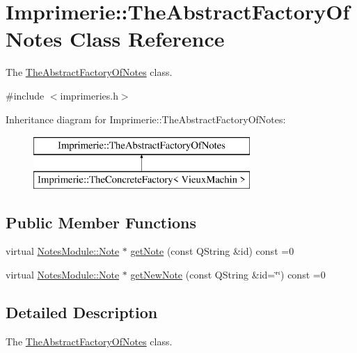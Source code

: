 \hypertarget{class_imprimerie_1_1_the_abstract_factory_of_notes}{\section{Imprimerie\-:\-:The\-Abstract\-Factory\-Of\-Notes Class Reference}
\label{class_imprimerie_1_1_the_abstract_factory_of_notes}
}


The \hyperlink{class_imprimerie_1_1_the_abstract_factory_of_notes}{The\-Abstract\-Factory\-Of\-Notes} class.  




{\ttfamily \#include $<$imprimeries.\-h$>$}

Inheritance diagram for Imprimerie\-:\-:The\-Abstract\-Factory\-Of\-Notes\-:\begin{figure}[H]
\begin{center}
\leavevmode
\includegraphics[height=2.000000cm]{class_imprimerie_1_1_the_abstract_factory_of_notes}
\end{center}
\end{figure}
\subsection*{Public Member Functions}
\begin{DoxyCompactItemize}
\item 
virtual \hyperlink{class_notes_module_1_1_note}{Notes\-Module\-::\-Note} $\ast$ \hyperlink{class_imprimerie_1_1_the_abstract_factory_of_notes_aff484de0ac8063abcb4478ff0df8f6ed}{get\-Note} (const Q\-String \&id) const =0
\item 
virtual \hyperlink{class_notes_module_1_1_note}{Notes\-Module\-::\-Note} $\ast$ \hyperlink{class_imprimerie_1_1_the_abstract_factory_of_notes_ac34193bee9fb0577e84e1afe0e571199}{get\-New\-Note} (const Q\-String \&id=\char`\"{}\char`\"{}) const =0
\end{DoxyCompactItemize}


\subsection{Detailed Description}
The \hyperlink{class_imprimerie_1_1_the_abstract_factory_of_notes}{The\-Abstract\-Factory\-Of\-Notes} class. 

